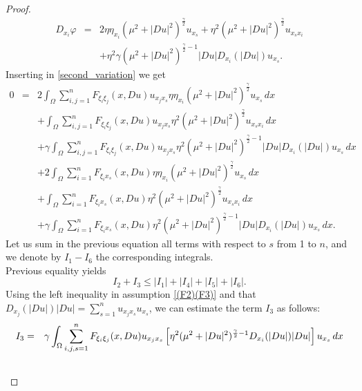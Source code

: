 \documentclass[12pt]{amsart}
\theoremstyle{definition}
\numberwithin{equation}{section}
\numberwithin{equation}{section}
\begin{document}
{\begin{proof}
\begin{eqnarray*}
 D_{x_i} \varphi &=&2 \eta \eta_{x_i} ({\mu}^2 +|Du|^2)^{\frac{\gamma}{2}} u_{x_s}+ \eta^2 ({\mu}^2 +|Du|^2)^{\frac{\gamma}{2}} u_{x_s x_i}  \\
 &&+  \eta^2 \gamma ({\mu}^2 +|Du|^2)^{\frac{\gamma}{2}-1} |Du| D_{x_i}(|Du|) u_{x_s}.  
\end{eqnarray*} 
Inserting in \eqref{second_variation} we get
\begin{eqnarray*}
0 &=& 2\int_{\Omega} \sum_{i,j=1}^n F_{\xi_i \xi_j}(x, Du) u_{x_j x_s} \eta \eta_{x_i} ({\mu}^2 +|Du|^2)^{\frac{\gamma}{2}} u_{x_s} \, dx\\
&& +  \int_{\Omega} \sum_{i,j=1}^n F_{\xi_i \xi_j}(x, Du) u_{x_j x_s} \eta^2 ({\mu}^2 +|Du|^2)^{\frac{\gamma}{2}} u_{x_s x_i} \, dx\\
&& + \gamma \int_{\Omega} \sum_{i,j=1}^n F_{\xi_i \xi_j}(x, Du) u_{x_j x_s} \eta^2   ({\mu}^2 +|Du|^2)^{\frac{\gamma}{2}-1} |Du| D_{x_i}(|Du|) u_{x_s} \, dx\\
&& + 2\int_{\Omega} \sum_{i=1}^n F_{\xi_i x_s}(x, Du) \eta \eta_{x_i}  ({\mu}^2 +|Du|^2)^{\frac{\gamma}{2}} u_{x_s} \, dx\\
&& +  \int_{\Omega} \sum_{i=1}^n F_{\xi_i x_s }(x, Du) \eta^2 ({\mu}^2 + |Du|^2)^{\frac{\gamma}{2}}  u_{x_s x_i} \, dx\\
&& +  \gamma\int_{\Omega} \sum_{i=1}^n F_{\xi_i x_s}(x, Du) \eta^2   ({\mu}^2 + |Du|^2)^{\frac{\gamma}{2}-1}  |Du| D_{x_i}(|Du|) u_{x_s} \, dx .
\end{eqnarray*}
Let us sum in the previous  equation  all terms with respect to $s$ from 1 to $n$, and we denote by ${I_1-I_6}$ the corresponding integrals.
\\
Previous equality yields
\begin{equation}\label{start}
	I_2+I_3\le |{I}_1|+|{I}_4|+|{I}_5|+|{I}_6|.
\end{equation}
Using  the left inequality in assumption \eqref{(F2)(F3)} and  that $D_{x_j}(|Du|)|Du|={\sum_{s=1}^n u_{x_j x_s} u_{x_s}}$, we can estimate the term $I_3$ as follows: 
\begin{eqnarray*}\label{I3}
{I}_3 &=& \gamma\int_{\Omega}  \sum_{i,j,s =1}^n F_{\xi_i \xi_j}(x, Du) u_{x_j x_s} \left [\eta^2   ({\mu}^2 + |Du|^2)^{\frac{\gamma}{2}-1}  D_{x_i}(|Du|)|Du| \right ] u_{x_s} \, dx\cr\cr

\end{eqnarray*}
\end{proof}}
\end{document}
